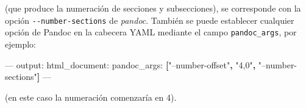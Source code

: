 \documentclass[]{book}
\newenvironment{Shaded}{\begin{snugshade}}{\end{snugshade}}
\newcommand{\KeywordTok}[1]{\textcolor[rgb]{0.13,0.29,0.53}{\textbf{#1}}}
\newcommand{\StringTok}[1]{\textcolor[rgb]{0.31,0.60,0.02}{#1}}
\newcommand{\OtherTok}[1]{\textcolor[rgb]{0.56,0.35,0.01}{#1}}
\newcommand{\FunctionTok}[1]{\textcolor[rgb]{0.00,0.00,0.00}{#1}}
\newcommand{\AttributeTok}[1]{\textcolor[rgb]{0.77,0.63,0.00}{#1}}
\theoremstyle{definition}
\theoremstyle{definition}
\theoremstyle{definition}
\theoremstyle{remark}
\begin{document}
(que produce la numeración de secciones y subsecciones), se corresponde
con la opción \texttt{-\/-number-sections} de \emph{pandoc}. También se
puede establecer cualquier opción de Pandoc en la cabecera YAML mediante
el campo \texttt{pandoc\_args}, por ejemplo:

\begin{Shaded}
\begin{Highlighting}[]
\OtherTok{---}
\FunctionTok{output:}
  \FunctionTok{html_document:}\AttributeTok{ }
    \FunctionTok{pandoc_args:}\AttributeTok{ }\KeywordTok{[}\StringTok{"--number-offset"}\KeywordTok{,} \StringTok{"4,0"}\KeywordTok{,} \StringTok{"--number-sections"}\KeywordTok{]}\AttributeTok{      }
\OtherTok{---}
\end{Highlighting}
\end{Shaded}

(en este caso la numeración comenzaría en 4).


\end{document}
